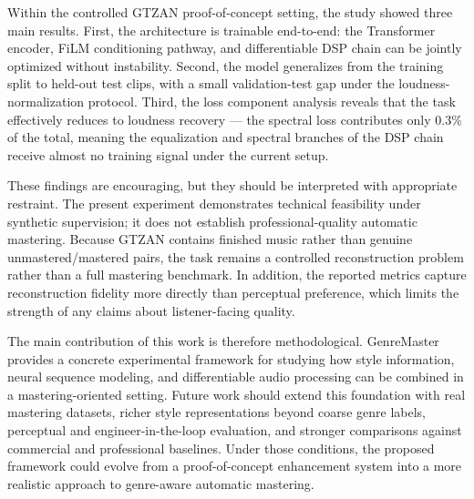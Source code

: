 \documentclass[journal]{IEEEtran}
\begin{document}
Within the controlled GTZAN proof-of-concept setting, the study showed three main results. First, the architecture is trainable end-to-end: the Transformer encoder, FiLM conditioning pathway, and differentiable DSP chain can be jointly optimized without instability. Second, the model generalizes from the training split to held-out test clips, with a small validation-test gap under the loudness-normalization protocol. Third, the loss component analysis reveals that the task effectively reduces to loudness recovery — the spectral loss contributes only 0.3\% of the total, meaning the equalization and spectral branches of the DSP chain receive almost no training signal under the current setup.

These findings are encouraging, but they should be interpreted with appropriate restraint. The present experiment demonstrates technical feasibility under synthetic supervision; it does not establish professional-quality automatic mastering. Because GTZAN contains finished music rather than genuine unmastered/mastered pairs, the task remains a controlled reconstruction problem rather than a full mastering benchmark. In addition, the reported metrics capture reconstruction fidelity more directly than perceptual preference, which limits the strength of any claims about listener-facing quality.

The main contribution of this work is therefore methodological. GenreMaster provides a concrete experimental framework for studying how style information, neural sequence modeling, and differentiable audio processing can be combined in a mastering-oriented setting. Future work should extend this foundation with real mastering datasets, richer style representations beyond coarse genre labels, perceptual and engineer-in-the-loop evaluation, and stronger comparisons against commercial and professional baselines. Under those conditions, the proposed framework could evolve from a proof-of-concept enhancement system into a more realistic approach to genre-aware automatic mastering.





\end{document}
